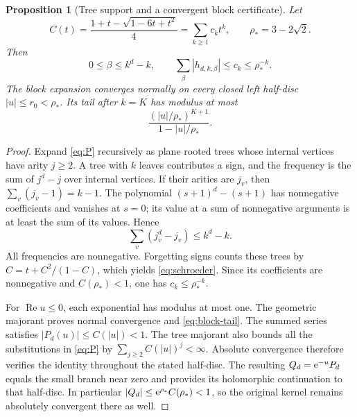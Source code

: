 \documentclass[11pt,a4paper]{article}
\numberwithin{equation}{section}
\newtheorem{proposition}[theorem]{Proposition}
\theoremstyle{definition}\newtheorem{definition}[theorem]{Definition}
\theoremstyle{remark}\newtheorem{remark}[theorem]{Remark}
\theoremstyle{definition}
\newcommand{\Rea}{\operatorname{Re}}\newcommand{\Ima}{\operatorname{Im}}
\begin{document}
\begin{proposition}[Tree support and a convergent block certificate]
\label{prop:blocks}
Let
\begin{equation}
 C(t)=\frac{1+t-\sqrt{1-6t+t^2}}4=\sum_{k\ge1}c_kt^k,
 \qquad \rho_* =3-2\sqrt2.
 \label{eq:schroeder}
\end{equation}
Then
\begin{equation}
 0\le\beta\le k^d-k,
 \qquad \sum_\beta|h_{d,k,\beta}|\le c_k\le\rho_*^{-k}.
 \label{eq:block-bounds}
\end{equation}
The block expansion converges normally on every closed left half-disc
$|u|\le r_0<\rho_*$. Its tail after $k=K$ has modulus at most
\begin{equation}
 \frac{(|u|/\rho_*)^{K+1}}{1-|u|/\rho_*}.
 \label{eq:block-tail}
\end{equation}
\end{proposition}
\begin{proof}
Expand \eqref{eq:P} recursively as plane rooted trees whose internal vertices
have arity $j\ge2$. A tree with $k$ leaves contributes a sign, and the
frequency is the sum of $j^d-j$ over internal vertices. If their arities are
$j_v$, then $\sum_v(j_v-1)=k-1$. The polynomial
$(s+1)^d-(s+1)$ has nonnegative coefficients and vanishes at $s=0$;
its value at a sum of nonnegative arguments is at least the sum of its values.
Hence
\[
 \sum_v(j_v^d-j_v)\le k^d-k.
\]
All frequencies are nonnegative. Forgetting signs counts these trees by
$C=t+C^2/(1-C)$, which yields \eqref{eq:schroeder}. Since its coefficients
are nonnegative and $C(\rho_*)<1$, one has $c_k\le\rho_*^{-k}$.

For $\Rea u\le0$, each exponential has modulus at most one. The geometric
majorant proves normal convergence and \eqref{eq:block-tail}. The summed
series satisfies $|P_d(u)|\le C(|u|)<1$. The tree majorant also bounds
all the substitutions in \eqref{eq:P} by $\sum_{j\ge2}C(|u|)^j<\infty$.
Absolute convergence therefore verifies the identity throughout the stated
half-disc. The resulting $Q_d=\mathrm e^{-u}P_d$ equals the small branch near zero
and provides its holomorphic continuation to that half-disc. In particular
$|Q_d|\le\mathrm e^{\rho_*}C(\rho_*)<1$, so the original kernel remains
absolutely convergent there as well.
\end{proof}
\end{document}
